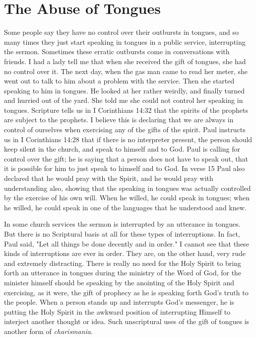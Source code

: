 \section*{The Abuse of Tongues}

Some people say they have no control over their outbursts in tongues, and so many times they just start speaking in tongues in a public service, interrupting the sermon. Sometimes these erratic outbursts come in conversations with friends. I had a lady tell me that when she received the gift of tongues, she had no control over it. The next day, when the gas man came to read her meter, she went out to talk to him about a problem with the service. Then she started speaking to him in tongues. He looked at her rather weirdly, and finally turned and hurried out of the yard. She told me she could not control her speaking in tongues. Scripture tells us in I Corinthians 14:32 that the spirits of the prophets are subject to the prophets. I believe this is declaring that we are always in control of ourselves when exercising any of the gifts of the spirit. Paul instructs us in I Corinthians 14:28 that if there is no interpreter present, the person should keep silent in the church, and speak to himself and to God. Paul is calling for control over the gift; he is saying that a person does not have to speak out, that it is possible for him to just speak to himself and to God. In verse 15 Paul also declared that he would pray with the Spirit, and he would pray with understanding also, showing that the speaking in tongues was actually controlled by the exercise of his own will. When he willed, he could speak in tongues; when he willed, he could speak in one of the languages that he understood and knew. 

In some church services the sermon is interrupted by an utterance in tongues. But there is no Scriptural basis at all for these types of interruptions. In fact, Paul said, "Let all things be done decently and in order." I cannot see that these kinds of interruptions are ever in order. They are, on the other hand, very rude and extremely distracting. There is really no need for the Holy Spirit to bring forth an utterance in tongues during the ministry of the Word of God, for the minister himself should be speaking by the anointing of the Holy Spirit and exercising, as it were, the gift of prophecy as he is speaking forth God's truth to the people. When a person stands up and interrupts God's messenger, he is putting the Holy Spirit in the awkward position of interrupting Himself to interject another thought or idea. Such unscriptural uses of the gift of tongues is another form of \emph{charismania}.

